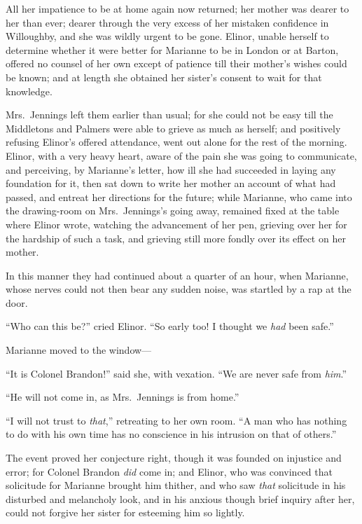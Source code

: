 \documentclass{article}
\begin{document}
All her impatience to be at home again now returned;
her mother was dearer to her than ever; dearer through
the very excess of her mistaken confidence in Willoughby,
and she was wildly urgent to be gone.  Elinor, unable herself
to determine whether it were better for Marianne to be
in London or at Barton, offered no counsel of her own
except of patience till their mother's wishes could be known;
and at length she obtained her sister's consent to wait
for that knowledge.

Mrs.\ Jennings left them earlier than usual; for she
could not be easy till the Middletons and Palmers were able
to grieve as much as herself; and positively refusing
Elinor's offered attendance, went out alone for the rest
of the morning.  Elinor, with a very heavy heart, aware of
the pain she was going to communicate, and perceiving,
by Marianne's letter, how ill she had succeeded in laying
any foundation for it, then sat down to write her mother
an account of what had passed, and entreat her directions
for the future; while Marianne, who came into the drawing-room
on Mrs.\ Jennings's going away, remained fixed at the table
where Elinor wrote, watching the advancement of her pen,
grieving over her for the hardship of such a task,
and grieving still more fondly over its effect on her mother.

In this manner they had continued about a quarter
of an hour, when Marianne, whose nerves could not then
bear any sudden noise, was startled by a rap at the door.

``Who can this be?'' cried Elinor.  ``So early too! I
thought we \emph{had} been safe.''

Marianne moved to the window---%

``It is Colonel Brandon!'' said she, with vexation.
``We are never safe from \emph{him}.''

``He will not come in, as Mrs.\ Jennings is from home.''

``I will not trust to \emph{that},'' retreating to her own room.
``A man who has nothing to do with his own time has no
conscience in his intrusion on that of others.''

The event proved her conjecture right, though it
was founded on injustice and error; for Colonel Brandon
\emph{did} come in; and Elinor, who was convinced that
solicitude for Marianne brought him thither, and who saw
\emph{that} solicitude in his disturbed and melancholy look,
and in his anxious though brief inquiry after her,
could not forgive her sister for esteeming him so lightly.
\end{document}
